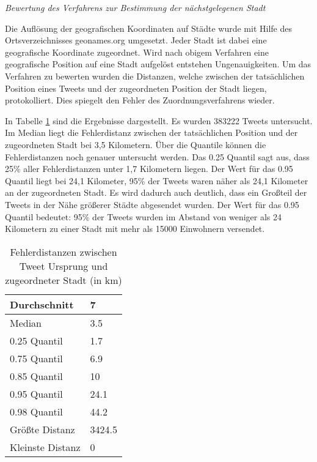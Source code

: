 			\textit{Bewertung des Verfahrens zur Bestimmung der nächstgelegenen Stadt}

				Die Auflösung der geografischen Koordinaten auf Städte wurde mit Hilfe des Ortsverzeichnisses geonames.org umgesetzt.
				Jeder Stadt ist dabei eine geografische Koordinate zugeordnet.
				Wird nach obigem Verfahren eine geografische Position auf eine Stadt aufgelöst entstehen Ungenauigkeiten.
				Um das Verfahren zu bewerten wurden die Distanzen, welche zwischen der tatsächlichen Position eines Tweets und der zugeordneten Position der Stadt liegen, protokolliert. 
				Dies spiegelt den Fehler des Zuordnungsverfahrens wieder.

				In Tabelle \ref{tab:distances} sind die Ergebnisse dargestellt.
				Es wurden 383222 Tweets untersucht.
				Im Median liegt die Fehlerdistanz zwischen der tatsächlichen Position und der zugeordneten Stadt bei 3,5 Kilometern.
				Über die Quantile können die Fehlerdistanzen noch genauer untersucht werden.
				Das 0.25 Quantil sagt aus, dass 25\% aller Fehlerdistanzen unter 1,7 Kilometern liegen.
				Der Wert für das 0.95 Quantil liegt bei 24,1 Kilometer, 95\% der Tweets waren näher als 24,1 Kilometer an der zugeordneten Stadt. 
				Es wird dadurch auch deutlich, dass ein Großteil der Tweets in der Nähe größerer Städte abgesendet wurden. 
				Der Wert für das 0.95 Quantil bedeutet: 95\% der Tweets wurden im Abstand von weniger als 24 Kilometern zu einer Stadt mit mehr als 15000 Einwohnern versendet.

					\begin{table}[h]
					\centering
					\caption{Fehlerdistanzen zwischen Tweet Ursprung und zugeordneter Stadt (in km)}
					\label{tab:distances}
					\begin{tabular}{|l|l|}
					\hline
					Durchschnitt & 7      \\ \hline
					Median       & 3.5    \\ \hline
					0.25 Quantil & 1.7    \\ \hline
					0.75 Quantil & 6.9    \\ \hline
					0.85 Quantil & 10     \\ \hline
					0.95 Quantil & 24.1   \\ \hline
					0.98 Quantil & 44.2   \\ \hline
					Größte Distanz      & 3424.5 \\ \hline
					Kleinste Distanz     & 0     \\ \hline
					\end{tabular}
					\end{table}

